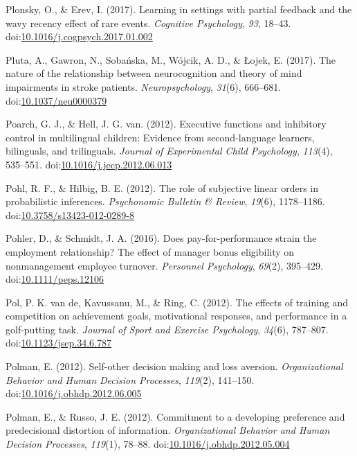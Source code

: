 \documentclass[english,man]{apa6}
\theoremstyle{definition}
\theoremstyle{definition}
\theoremstyle{definition}
\theoremstyle{remark}
\begin{document}
\hypertarget{ref-Plonsky2017}{}
Plonsky, O., \& Erev, I. (2017). Learning in settings with partial
feedback and the wavy recency effect of rare events. \emph{Cognitive
Psychology}, \emph{93}, 18--43.
doi:\href{https://doi.org/10.1016/j.cogpsych.2017.01.002}{10.1016/j.cogpsych.2017.01.002}

\hypertarget{ref-Pluta2017}{}
Pluta, A., Gawron, N., Sobańska, M., Wójcik, A. D., \& Łojek, E. (2017).
The nature of the relationship between neurocognition and theory of mind
impairments in stroke patients. \emph{Neuropsychology}, \emph{31}(6),
666--681.
doi:\href{https://doi.org/10.1037/neu0000379}{10.1037/neu0000379}

\hypertarget{ref-Poarch2012}{}
Poarch, G. J., \& Hell, J. G. van. (2012). Executive functions and
inhibitory control in multilingual children: Evidence from
second-language learners, bilinguals, and trilinguals. \emph{Journal of
Experimental Child Psychology}, \emph{113}(4), 535--551.
doi:\href{https://doi.org/10.1016/j.jecp.2012.06.013}{10.1016/j.jecp.2012.06.013}

\hypertarget{ref-Pohl2012}{}
Pohl, R. F., \& Hilbig, B. E. (2012). The role of subjective linear
orders in probabilistic inferences. \emph{Psychonomic Bulletin \&
Review}, \emph{19}(6), 1178--1186.
doi:\href{https://doi.org/10.3758/s13423-012-0289-8}{10.3758/s13423-012-0289-8}

\hypertarget{ref-Pohler2016}{}
Pohler, D., \& Schmidt, J. A. (2016). Does pay-for-performance strain
the employment relationship? The effect of manager bonus eligibility on
nonmanagement employee turnover. \emph{Personnel Psychology},
\emph{69}(2), 395--429.
doi:\href{https://doi.org/10.1111/peps.12106}{10.1111/peps.12106}

\hypertarget{ref-VandePolP2012}{}
Pol, P. K. van de, Kavussanu, M., \& Ring, C. (2012). The effects of
training and competition on achievement goals, motivational responses,
and performance in a golf-putting task. \emph{Journal of Sport and
Exercise Psychology}, \emph{34}(6), 787--807.
doi:\href{https://doi.org/10.1123/jsep.34.6.787}{10.1123/jsep.34.6.787}

\hypertarget{ref-Polman2012}{}
Polman, E. (2012). Self-other decision making and loss aversion.
\emph{Organizational Behavior and Human Decision Processes},
\emph{119}(2), 141--150.
doi:\href{https://doi.org/10.1016/j.obhdp.2012.06.005}{10.1016/j.obhdp.2012.06.005}

\hypertarget{ref-Polman2012a}{}
Polman, E., \& Russo, J. E. (2012). Commitment to a developing
preference and predecisional distortion of information.
\emph{Organizational Behavior and Human Decision Processes},
\emph{119}(1), 78--88.
doi:\href{https://doi.org/10.1016/j.obhdp.2012.05.004}{10.1016/j.obhdp.2012.05.004}
\end{document}
